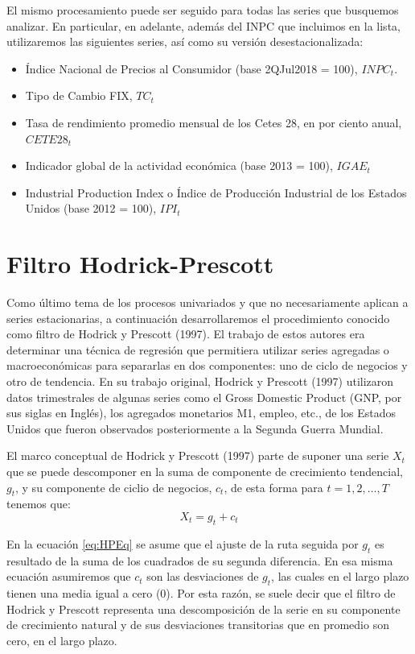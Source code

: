 \documentclass[
]{book}
\begin{document}
El mismo procesamiento puede ser seguido para todas las series que busquemos analizar. En particular, en adelante, además del INPC que incluimos en la lista, utilizaremos las siguientes series, así como su versión desestacionalizada:

\begin{itemize}
    \item Índice Nacional de Precios al Consumidor (base 2QJul2018 = 100), $INPC_t$.
    \item Tipo de Cambio FIX, $TC_t$
    \item Tasa de rendimiento promedio mensual de los Cetes 28, en por ciento anual, $CETE28_t$
    \item Indicador global de la actividad económica (base 2013 = 100), $IGAE_t$
    \item Industrial Production Index o Índice de Producción Industrial de los Estados Unidos (base 2012 = 100), $IPI_t$
\end{itemize}

\hypertarget{filtro-hodrick-prescott}{%
\section{Filtro Hodrick-Prescott}\label{filtro-hodrick-prescott}}

Como último tema de los procesos univariados y que no necesariamente aplican a series estacionarias, a continuación desarrollaremos el procedimiento conocido como filtro de Hodrick y Prescott (1997). El trabajo de estos autores era determinar una técnica de regresión que permitiera utilizar series agregadas o macroeconómicas para separarlas en dos componentes: uno de ciclo de negocios y otro de tendencia. En su trabajo original, Hodrick y Prescott (1997) utilizaron datos trimestrales de algunas series como el Gross Domestic Product (GNP, por sus siglas en Inglés), los agregados monetarios M1, empleo, etc., de los Estados Unidos que fueron observados posteriormente a la Segunda Guerra Mundial.

El marco conceptual de Hodrick y Prescott (1997) parte de suponer una serie \(X_t\) que se puede descomponer en la suma de componente de crecimiento tendencial, \(g_t\), y su componente de ciclio de negocios, \(c_t\), de esta forma para \(t = 1, 2, \ldots, T\) tenemos que:
\begin{equation}
    X_t = g_t + c_t
    \label{eq:HPEq}
\end{equation}

En la ecuación \eqref{eq:HPEq} se asume que el ajuste de la ruta seguida por \(g_t\) es resultado de la suma de los cuadrados de su segunda diferencia. En esa misma ecuación asumiremos que \(c_t\) son las desviaciones de \(g_t\), las cuales en el largo plazo tienen una media igual a cero (0). Por esta razón, se suele decir que el filtro de Hodrick y Prescott representa una descomposición de la serie en su componente de crecimiento natural y de sus desviaciones transitorias que en promedio son cero, en el largo plazo.
\end{document}

